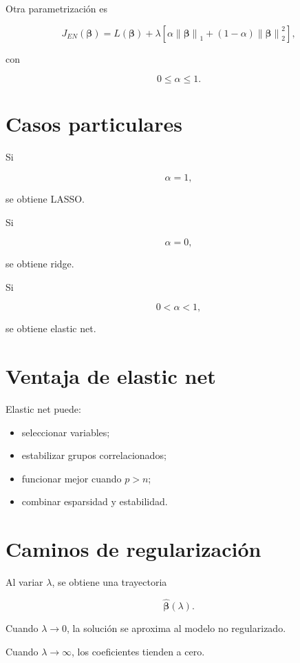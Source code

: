\documentclass[
  spanish,
  11pt,
  letterpaper,
  DIV=11,
  numbers=noendperiod]{scrreprt}
\providecommand{\tightlist}{%
  \setlength{\itemsep}{0pt}\setlength{\parskip}{0pt}}
\theoremstyle{definition}
\theoremstyle{plain}
\theoremstyle{definition}
\theoremstyle{remark}
\begin{document}
Otra parametrización es

\[
J_{EN}(\boldsymbol{\beta})
=
L(\boldsymbol{\beta})
+
\lambda
\left[
\alpha
\left\|
\boldsymbol{\beta}
\right\|_1
+
(1-\alpha)
\left\|
\boldsymbol{\beta}
\right\|_2^2
\right],
\]

con

\[
0\leq\alpha\leq 1.
\]

\section{Casos particulares}\label{casos-particulares}

Si

\[
\alpha=1,
\]

se obtiene LASSO.

Si

\[
\alpha=0,
\]

se obtiene ridge.

Si

\[
0<\alpha<1,
\]

se obtiene elastic net.

\section{Ventaja de elastic net}\label{ventaja-de-elastic-net}

Elastic net puede:

\begin{itemize}
\tightlist
\item
  seleccionar variables;
\item
  estabilizar grupos correlacionados;
\item
  funcionar mejor cuando \(p>n\);
\item
  combinar esparsidad y estabilidad.
\end{itemize}

\section{Caminos de regularización}\label{caminos-de-regularizaciuxf3n}

Al variar \(\lambda\), se obtiene una trayectoria

\[
\widehat{\boldsymbol{\beta}}(\lambda).
\]

Cuando \(\lambda\to 0\), la solución se aproxima al modelo no
regularizado.

Cuando \(\lambda\to\infty\), los coeficientes tienden a cero.
\end{document}
